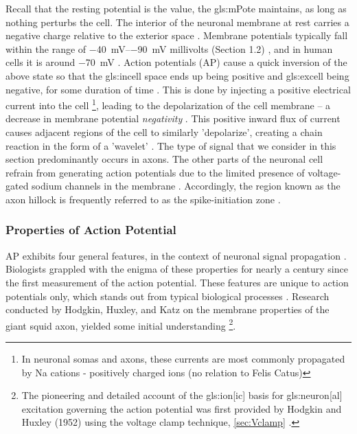 \documentclass[class={myRUCProject}, crop=false]{standalone}
\begin{document}
Recall that the resting potential is the value, the \gls{gls:mPote} maintains, as long as nothing perturbs the cell. The interior of the neuronal membrane at rest carries a negative charge relative to the exterior space \cite{wood1996neuroscience}. Membrane potentials typically fall within the range of \qtyrange{-40}{-90}{\mV} millivolts (Section 1.2) \cite{ramachandran2002encyclopedia}, and in human cells it is around {\qty{-70}{\milli\volt}} \cite{ Hammond2015ch4}. Action potentials (AP) cause a quick inversion of the above state so that the \gls{gls:incell} space ends up being positive and \gls{gls:excell} being negative, for some duration of time \cite{wood1996neuroscience}. This is done by injecting a positive electrical current into the cell \footnote{In neuronal somas and axons, these currents are most commonly propagated by \gls{Na} cations - positively charged ions (no relation to Felis Catus)}, leading to the depolarization of the cell membrane – a decrease in membrane potential \textit{negativity} \cite{ramachandran2002encyclopedia}. This positive inward flux of current causes adjacent regions of the cell to similarly 'depolarize', creating a chain reaction in the form of a 'wavelet' \cite{Hammond2015ch3}. The type of signal that we consider in this section predominantly occurs in axons. The other parts of the neuronal cell refrain from generating action potentials due to the limited presence of voltage-gated sodium channels in the membrane \cite{wood1996neuroscience}. Accordingly, the region known as the axon hillock is frequently referred to as the spike-initiation zone \cite{wood1996neuroscience}.

\subsubsection{Properties of Action Potential}
AP exhibits four general features, in the context of neuronal signal propagation \cite{kandel2000principles}. Biologists grappled with the enigma of these properties for nearly a century since the first measurement of the action potential. These features are unique to action potentials only, which stands out from typical biological processes \cite{kandel2000principles}. Research conducted by Hodgkin, Huxley, and Katz on the membrane properties of the giant squid axon, yielded some initial understanding \footnote{The pioneering and detailed account of the \gls{gls:ion}[ic] basis for \gls{gls:neuron}[al] excitation governing the action potential was first provided by Hodgkin and Huxley (1952) using the voltage clamp technique,  \cref{sec:Vclamp} \cite{HodHux1952,kandel2000principles}.}.
\end{document}
